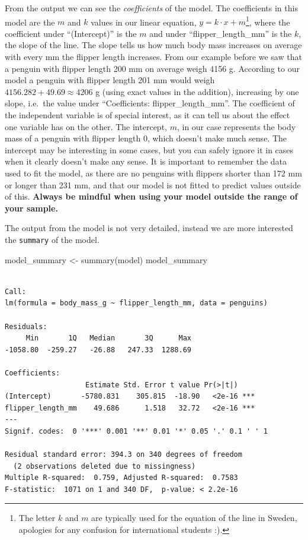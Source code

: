 \documentclass[
  letterpaper,
  DIV=11,
  numbers=noendperiod]{scrreprt}
\newenvironment{Shaded}{\begin{snugshade}}{\end{snugshade}}
\newcommand{\FunctionTok}[1]{\textcolor[rgb]{0.28,0.35,0.67}{#1}}
\newcommand{\NormalTok}[1]{\textcolor[rgb]{0.00,0.23,0.31}{#1}}
\newcommand{\OtherTok}[1]{\textcolor[rgb]{0.00,0.23,0.31}{#1}}
\begin{document}
From the output we can see the \emph{coefficients} of the model. The
coefficients in this model are the \(m\) and \(k\) values in our linear
equation, \(y = k \cdot x + m\)\footnote{The letter \(k\) and \(m\) are
  typically used for the equation of the line in Sweden, apologies for
  any confusion for international students :).}, where the coefficient
under ``(Intercept)'' is the \(m\) and under ``flipper\_length\_mm'' is
the \(k\), the slope of the line. The slope tells us how much body mass
increases on average with every mm the flipper length increases. From
our example before we saw that a penguin with flipper length 200 mm on
average weigh 4156 g. According to our model a penguin with flipper
length 201 mm would weigh \(4156.282 + 49.69 \approx 4206\) g (using
exact values in the addition), increasing by one slope, i.e.~the value
under ``Coefficients: flipper\_length\_mm''. The coefficient of the
independent variable is of special interest, as it can tell us about the
effect one variable has on the other. The intercept, \(m\), in our case
represents the body mass of a penguin with flipper length 0, which
doesn't make much sense. The intercept may be interesting in some cases,
but you can safely ignore it in cases when it clearly doesn't make any
sense. It is important to remember the data used to fit the model, as
there are no penguins with flippers shorter than 172 mm or longer than
231 mm, and that our model is not fitted to predict values outside of
this. \textbf{Always be mindful when using your model outside the range
of your sample.}

The output from the model is not very detailed, instead we are more
interested the \texttt{summary} of the model.

\begin{Shaded}
\begin{Highlighting}[]
\NormalTok{model\_summary }\OtherTok{\textless{}{-}} \FunctionTok{summary}\NormalTok{(model)}
\NormalTok{model\_summary}
\end{Highlighting}
\end{Shaded}

\begin{verbatim}

Call:
lm(formula = body_mass_g ~ flipper_length_mm, data = penguins)

Residuals:
     Min       1Q   Median       3Q      Max 
-1058.80  -259.27   -26.88   247.33  1288.69 

Coefficients:
                   Estimate Std. Error t value Pr(>|t|)    
(Intercept)       -5780.831    305.815  -18.90   <2e-16 ***
flipper_length_mm    49.686      1.518   32.72   <2e-16 ***
---
Signif. codes:  0 '***' 0.001 '**' 0.01 '*' 0.05 '.' 0.1 ' ' 1

Residual standard error: 394.3 on 340 degrees of freedom
  (2 observations deleted due to missingness)
Multiple R-squared:  0.759, Adjusted R-squared:  0.7583 
F-statistic:  1071 on 1 and 340 DF,  p-value: < 2.2e-16
\end{verbatim}
\end{document}
